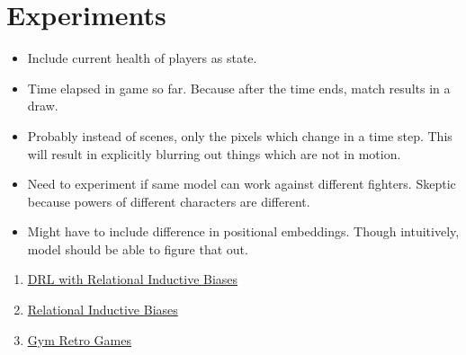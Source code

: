 \documentclass{article}
\begin{document}
\section{Experiments}
\begin{itemize}
    \item Include current health of players as state. 
    \item Time elapsed in game so far. Because after the time ends, match results in a draw.
    \item Probably instead of scenes, only the pixels which change in a time step. This will result in explicitly blurring out things which are not in motion.
    \item Need to experiment if same model can work against different fighters. Skeptic because powers of different characters are different.
    \item Might have to include difference in positional embeddings. Though intuitively, model should be able to figure that out.
\end{itemize}  






\begin{enumerate}
    \item \href{https://openreview.net/pdf?id=HkxaFoC9KQ}{DRL with Relational Inductive Biases}
    \item \href{https://arxiv.org/pdf/1806.01261.pdf}{Relational Inductive Biases}
    \item \href{https://github.com/openai/retro/tree/master/retro/data/stable}{Gym Retro Games}
\end{enumerate}
\end{document}
